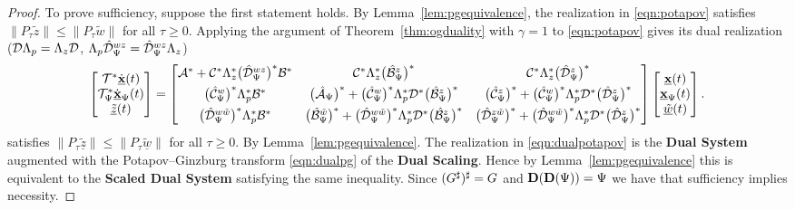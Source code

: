 \begin{proof}
    To prove sufficiency, suppose the first statement holds. By Lemma~\ref{lem:pgequivalence},
    the realization in \eqref{eqn:potapov} satisfies
    $\|P_\tau\tilde{z}\|\leq\|P_\tau\tilde{w}\|$ for all $\tau\geq0$.
    Applying the argument of Theorem~\ref{thm:ogduality} with
    $\gamma=1$ to \eqref{eqn:potapov} gives its dual realization 
    ($\mathcal{D}\Lambda_p=\Lambda_z\mathcal{D}$, $\Lambda_p\hat{\mathcal{D}}_\Psi^{wz} = \hat{\mathcal{D}}_\Psi^{wz}\Lambda_z$)
    \begin{equation}\label{eqn:dualpotapov}
    \begin{bmatrix}\mathcal{T}^*\dot{\underline{\mathbf{x}}}(t) \\
          \mathcal{T}_\Psi^*\dot{\underline{\mathbf{x}}}_\Psi(t)\\
          \underline{\tilde{z}}(t)\end{bmatrix}
    =
    \begin{bmatrix}
        \mathcal{A}^*
            +\mathcal{C}^*\Lambda_z^*
             \bigl(\hat{\mathcal{D}}_\Psi^{wz}\bigr)^*\mathcal{B}^*
        &
        \mathcal{C}^*\Lambda_z^*
             \bigl(\hat{\mathcal{B}}_\Psi^{z}\bigr)^*
        &
        \mathcal{C}^*\Lambda_z^*
             \bigl(\hat{\mathcal{D}}_\Psi^{z}\bigr)^*
        \\[4pt]
        \bigl(\hat{\mathcal{C}}_\Psi^w\bigr)^*
            \Lambda_p^*\mathcal{B}^*
        &
        \bigl(\hat{\mathcal{A}}_\Psi\bigr)^*
            +\bigl(\hat{\mathcal{C}}_\Psi^w\bigr)^*
             \Lambda_p^*\mathcal{D}^*
             \bigl(\hat{\mathcal{B}}_\Psi^{z}\bigr)^*
        &
        \bigl(\hat{\mathcal{C}}_\Psi^z\bigr)^*
            +\bigl(\hat{\mathcal{C}}_\Psi^w\bigr)^*
             \Lambda_p^*\mathcal{D}^*
             \bigl(\hat{\mathcal{D}}_\Psi^{z}\bigr)^*
        \\[4pt]
        \bigl(\hat{\mathcal{D}}_\Psi^{w\tilde{w}}\bigr)^*
            \Lambda_p^*\mathcal{B}^*
        &
        \bigl(\hat{\mathcal{B}}_\Psi^{\tilde{w}}\bigr)^*
            +\bigl(\hat{\mathcal{D}}_\Psi^{w\tilde{w}}\bigr)^*
             \Lambda_p^*\mathcal{D}^*
             \bigl(\hat{\mathcal{B}}_\Psi^{z}\bigr)^*
        &
        \bigl(\hat{\mathcal{D}}_\Psi^{z\tilde{w}}\bigr)^*
            +\bigl(\hat{\mathcal{D}}_\Psi^{w\tilde{w}}\bigr)^*
             \Lambda_p^*\mathcal{D}^*
             \bigl(\hat{\mathcal{D}}_\Psi^{z}\bigr)^*\end{bmatrix}
    \begin{bmatrix}\underline{\mathbf{x}}(t) \\
          \underline{\mathbf{x}}_\Psi(t) \\
          \underline{\tilde{w}}(t)\end{bmatrix}.
\end{equation}
    satisfies
    $\|P_\tau\tilde{\underline{z}}\|\leq
    \|P_\tau\tilde{\underline{w}}\|$ for all $\tau\geq0$.
    By Lemma~\ref{lem:pgequivalence}. The realization in \eqref{eqn:dualpotapov} is the
    \textbf{Dual System} augmented with the Potapov--Ginzburg transform
    \eqref{eqn:dualpg} of the \textbf{Dual Scaling}. Hence by Lemma~\ref{lem:pgequivalence} this is equivalent to the
    \textbf{Scaled Dual System} satisfying the same inequality.
    Since $(G^\sharp)^\sharp=G$ and  $\mathbf{D}(\mathbf{D}(\Psi))=\Psi$ we have that sufficiency implies necessity.
\end{proof}


